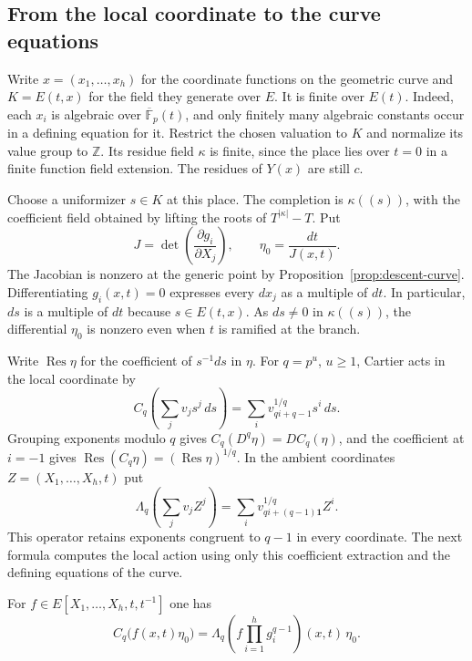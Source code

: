 \subsection{From the local coordinate to the curve equations}

Write $x=(x_1,\ldots,x_h)$ for the coordinate functions on the
geometric curve and $K=E(t,x)$ for the field they generate over $E$.
It is finite over $E(t)$. Indeed, each $x_i$ is algebraic over
$\overline{\mathbb F}_p(t)$, and only finitely many algebraic constants
occur in a defining equation for it. Restrict the chosen valuation to
$K$ and normalize its value group to $\mathbb Z$. Its residue field
$\kappa$ is finite, since the place lies over $t=0$ in a finite
function field extension. The residues of $Y(x)$ are still $c$.

Choose a uniformizer $s\in K$ at this place. The completion is
$\kappa((s))$, with the coefficient field obtained by lifting the
roots of $T^{|\kappa|}-T$. Put
\[
   J=\det\left(\frac{\partial g_i}{\partial X_j}\right),\qquad
   \eta_0=\frac{dt}{J(x,t)} .
\]
The Jacobian is nonzero at the generic point by
Proposition~\ref{prop:descent-curve}. Differentiating $g_i(x,t)=0$
expresses every $dx_j$ as a multiple of $dt$. In particular, $ds$
is a multiple of $dt$ because $s\in E(t,x)$. As $ds\ne0$ in
$\kappa((s))$, the differential $\eta_0$ is nonzero even when
$t$ is ramified at the branch.

Write $\operatorname{Res}\eta$ for the coefficient of $s^{-1}ds$ in
$\eta$. For $q=p^u$, $u\ge1$, Cartier acts in the local coordinate by
\[
 C_q\!\left(\sum_j v_j s^j\,ds\right)
       =\sum_i v_{q i+q-1}^{1/q}s^i\,ds .
\]
Grouping exponents modulo $q$ gives $C_q(D^q\eta)=D C_q(\eta)$,
and the coefficient at $i=-1$ gives
$\operatorname{Res}(C_q\eta)=(\operatorname{Res}\eta)^{1/q}$.
In the ambient coordinates $Z=(X_1,\ldots,X_h,t)$ put
\[
   \Lambda_q\!\left(\sum_j v_j Z^j\right)
        =\sum_i v_{q i+(q-1)\mathbf1}^{1/q} Z^i .
\]
This operator retains exponents congruent to $q-1$ in every
coordinate. The next formula computes the local action using only
this coefficient extraction and the defining equations of the curve.

\begin{lemma}\label{lem:cartier-formula}
For $f\in E[X_1,\ldots,X_h,t,t^{-1}]$ one has
\begin{equation}\label{eq:cartier-adjunction}
 C_q\bigl(f(x,t)\eta_0\bigr)
       =\Lambda_q\!\left(f\prod_{i=1}^h g_i^{q-1}\right)(x,t)\,\eta_0 .
\end{equation}
\end{lemma}

